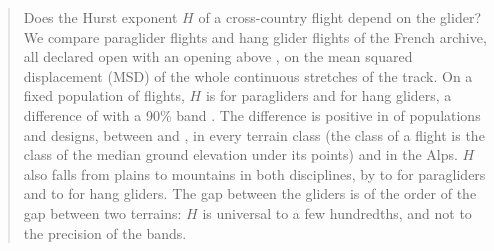 \begin{abstract}
\noindent Does the Hurst exponent $H$ of a cross-country flight depend on the glider? We compare
\UniFunnelParaOpen{} paraglider flights and \UniFunnelHangOpen{} hang glider flights of the French archive, all
declared open with an opening above \UniMinOpening, on the mean squared displacement (MSD) of the whole
continuous stretches of the track. On a fixed population of flights, $H$ is \UniHFirstAllAfixed{} for paragliders and
\UniHSecondAllAfixed{} for hang gliders, a difference of \UniDHAllAfixed{} with a 90\% band \UniDHBandAllAfixed. The
difference is positive in \UniForestPos{} of \UniForestN{} populations and designs, between \UniForestMin{} and
\UniForestMax, in every terrain class (the class of a flight is the class of the median ground elevation under its
points) and in the Alps. $H$ also falls from plains to mountains in both disciplines, by \UniHFirstPlainsAfixed{} to \UniHFirstHighAfixed{} for
paragliders and \UniHSecondPlainsAfixed{} to \UniHSecondHighAfixed{} for hang gliders. The gap between the gliders is
of the order of the gap between two terrains: $H$ is universal to a few hundredths, and not to the precision of the
bands.
\end{abstract}
